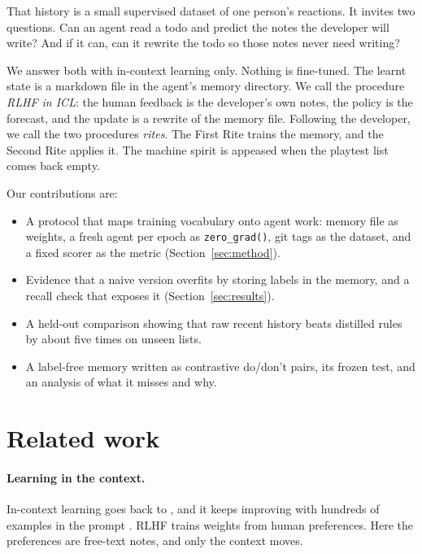 \documentclass[10pt]{article}
\begin{document}
That history is a small supervised dataset of one person's reactions. It invites two questions. Can an agent read a todo and predict the notes the developer will write? And if it can, can it rewrite the todo so those notes never need writing?

We answer both with in-context learning only. Nothing is fine-tuned. The learnt state is a markdown file in the agent's memory directory. We call the procedure \emph{RLHF in ICL}: the human feedback is the developer's own notes, the policy is the forecast, and the update is a rewrite of the memory file. Following the developer, we call the two procedures \emph{rites}. The First Rite trains the memory, and the Second Rite applies it. The machine spirit is appeased when the playtest list comes back empty.

Our contributions are:
\begin{itemize}[leftmargin=*]
  \item A protocol that maps training vocabulary onto agent work: memory file as weights, a fresh agent per epoch as \texttt{zero\_grad()}, git tags as the dataset, and a fixed scorer as the metric (Section~\ref{sec:method}).
  \item Evidence that a naive version overfits by storing labels in the memory, and a recall check that exposes it (Section~\ref{sec:results}).
  \item A held-out comparison showing that raw recent history beats distilled rules by about five times on unseen lists.
  \item A label-free memory written as contrastive do/don't pairs, its frozen test, and an analysis of what it misses and why.
\end{itemize}

\section{Related work}

\paragraph{Learning in the context.} In-context learning goes back to \citet{brown2020language}, and it keeps improving with hundreds of examples in the prompt \citep{agarwal2024manyshot}. RLHF \citep{ouyang2022training} trains weights from human preferences. Here the preferences are free-text notes, and only the context moves.
\end{document}
